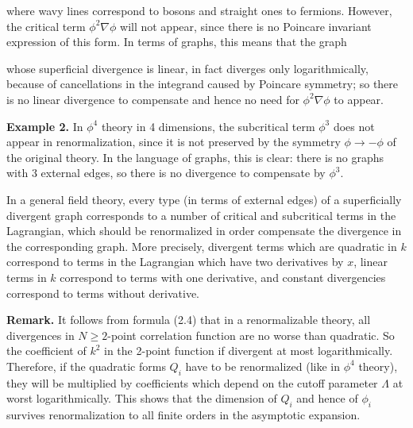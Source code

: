 \documentclass[11pt]{article}
\def\L{\Lambda}
\begin{document}
where wavy lines correspond to bosons and straight ones to fermions. 
However, the critical term $\phi^2\nabla\phi$ will not appear, since there
is no Poincare invariant expression of this form. In terms of graphs, this
means that the graph

\begin{center} 
 
 
 
\end{center}


whose superficial divergence is linear, in fact diverges
only logarithmically, because of cancellations in the integrand 
caused by Poincare symmetry; so there is no linear divergence to compensate
and hence no need for $\phi^2\nabla\phi$ to appear.  

{\bf Example 2.} In $\phi^4$ theory in 4 dimensions, the subcritical 
term $\phi^3$ does not appear in renormalization, since it is not preserved
by the symmetry $\phi\to -\phi$ of the original theory.
In the language of graphs, this is clear: there is no graphs 
with 3 external edges, so there is no divergence to compensate
by $\phi^3$.

 In a general field theory, 
every type (in terms of external edges) 
of a superficially divergent graph corresponds to a 
number of critical and subcritical 
terms in the Lagrangian, which should be renormalized
in order compensate the divergence in the corresponding graph. 
More precisely, divergent terms which are quadratic 
in $k$ correspond to terms in the Lagrangian which have two 
derivatives by $x$, linear terms in $k$ 
correspond to terms with one derivative, and constant 
divergencies correspond to terms without derivative. 

{\bf Remark.} It follows from formula (2.4) that
in a renormalizable theory, all divergences in $N\ge 2$-point 
correlation function are no worse than quadratic.
So the coefficient of $k^2$ in the 2-point function
if divergent at most logarithmically. 
Therefore, if the quadratic forms $Q_i$ have to be renormalized
(like in $\phi^4$ theory), 
they will be multiplied by coefficients which depend 
on the cutoff parameter $\L$ at worst logarithmically. This shows that
the dimension of $Q_i$ and hence of $\phi_i$ survives renormalization
to all finite orders in the asymptotic expansion.
\end{document}
